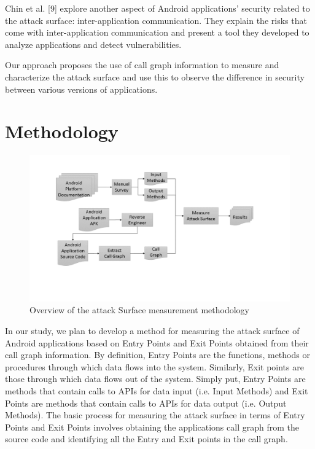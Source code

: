 \documentclass[conference]{IEEEtran}
\begin{document}
Chin et al. [9] explore another aspect of Android applications' security related to the attack surface: inter-application communication. They explain the risks that come with inter-application communication and present a tool they developed to analyze applications and detect vulnerabilities.

Our approach proposes the use of call graph information to measure and characterize the attack surface and use this to observe the difference in security between various versions of applications.

\section{Methodology}

\begin{figure}
  \centering
  \includegraphics[scale=0.45]{figs/methodology.png}
  \caption{Overview of the attack Surface measurement methodology}
  \label{fig:methodology}
\end{figure}

In our study, we plan to develop a method for measuring the attack surface of Android applications based on Entry Points and Exit Points obtained from their call graph information. By definition, Entry Points are the functions, methods or procedures through which data flows into the system. Similarly, Exit points are those through which data flows out of the system. Simply put, Entry Points are methods that contain calls to APIs for data input (i.e. Input Methods) and Exit Points are methods that contain calls to APIs for data output (i.e. Output Methods). The basic process for measuring the attack surface in terms of Entry Points and Exit Points involves obtaining the applications call graph from the source code and identifying all the Entry and Exit points in the call graph.
\end{document}

